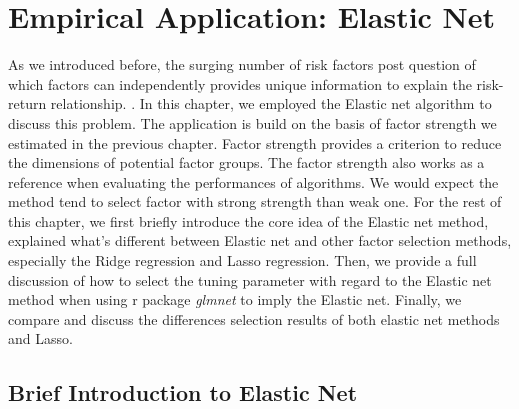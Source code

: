 \chapter{Empirical Application: Elastic Net}\label{Empirical:Elastic_net}
As we introduced before, the surging number of risk factors post question of which factors can independently provides unique information to explain the risk-return relationship. \cite{Cochrane2011}.
In this chapter, we employed the Elastic net algorithm to discuss this problem.
The application is build on the basis of factor strength we estimated in the previous chapter.
Factor strength provides a criterion to reduce the dimensions of potential factor groups.
The factor strength also works as a reference when evaluating the performances of algorithms.
We would expect the method tend to select factor with strong strength than weak one.
For the rest of this chapter, we first briefly introduce the core idea of the Elastic net method, explained what's different between Elastic net and other factor selection methods, especially the Ridge regression and Lasso regression.
Then, we provide a full discussion of how to select the tuning parameter with regard to the Elastic net method when using r package \textit{glmnet} to imply the Elastic net.
Finally, we compare and discuss the differences selection results of both elastic net methods and Lasso.


\section{Brief Introduction to Elastic Net} \label{Elastic_Net}

